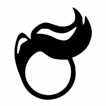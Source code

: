 \documentclass[
11pt, %
english, %
singlespacing, %
headsepline, %
]{thesis} %
\begin{document}
\pagestyle{thesis} %












\appendix %




\clearpage



\clearpage
\thispagestyle{empty}
\centering
\includegraphics[height=2in]{figures/snazzy.pdf}	

\end{document}
